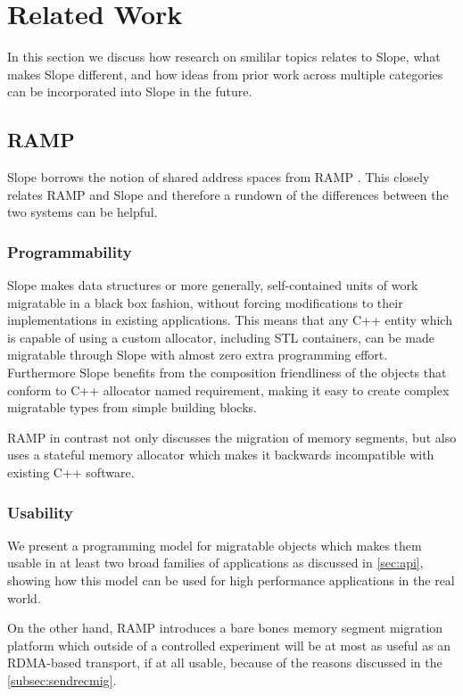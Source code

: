\chapter{Related Work}
\label{chap:related}
In this section we discuss how research on smililar topics relates to
Slope, what makes Slope different, and how ideas from prior work across
multiple categories can be incorporated into Slope in the future.

\section{RAMP}
Slope borrows the notion of shared address spaces from RAMP
\cite{memon2018ramp}. This closely relates RAMP and Slope and therefore
a rundown of the differences between the two systems can be helpful.

\subsection{Programmability}
Slope makes data structures or more generally, self-contained units of
work migratable in a black box fashion, without forcing modifications to
their implementations in existing applications.
This means that any C++ entity which is capable of using a custom
allocator, including STL containers, can be made migratable through Slope
with almost zero extra programming effort. Furthermore Slope benefits
from the composition friendliness of the objects that conform to C++ 
allocator named requirement, making it easy to create complex migratable
types from simple building blocks.

RAMP in contrast not only discusses the
migration of memory segments,
but also uses a stateful memory allocator which makes it
backwards incompatible with existing C++ software.

\subsection{Usability}
We present a programming model for migratable objects which makes them
usable in at least two broad families of applications as discussed in
\ref{sec:api}, showing how this model can be used for high performance
applications in the real world.

On the other hand, RAMP introduces a bare bones memory segment migration
platform which outside of a controlled experiment will be at most as
useful as an RDMA-based transport, if at all usable,
because of the reasons discussed in the \ref{subsec:sendrecmig}.

